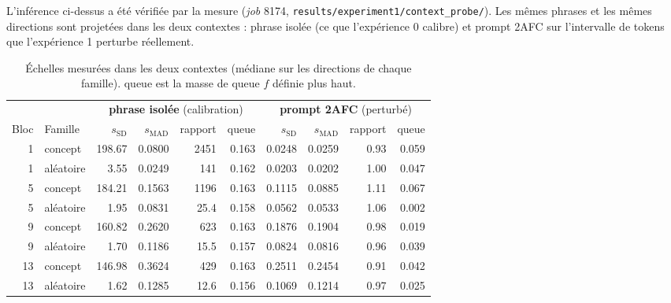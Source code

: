 \documentclass[11pt,a4paper]{article}
\newcommand{\ssd}{s_{\mathrm{SD}}}
\newcommand{\smad}{s_{\mathrm{MAD}}}
\newcommand{\code}[1]{\texttt{\small #1}}
\begin{document}
L'inférence ci-dessus a été vérifiée par la mesure (\emph{job} \num{8174},
\code{results/experiment1/context\_probe/}). Les mêmes phrases et les mêmes directions
sont projetées dans les deux contextes : phrase isolée (ce que l'expérience 0 calibre) et
prompt 2AFC sur l'intervalle de tokens que l'expérience 1 perturbe réellement.

\begin{table}[h]
\centering
\caption{Échelles mesurées dans les deux contextes (médiane sur les directions de chaque
famille). \og queue \fg{} est la masse de queue $f$ définie plus haut.}
\label{tab:probe}
\begin{tabular}{rl|rrrr|rrrr}
\toprule
& & \multicolumn{4}{c|}{\textbf{phrase isolée} (calibration)}
  & \multicolumn{4}{c}{\textbf{prompt 2AFC} (perturbé)} \\
Bloc & Famille & $\ssd$ & $\smad$ & rapport & queue
               & $\ssd$ & $\smad$ & rapport & queue \\
\midrule
1  & concept   & \num{198.67} & \num{0.0800} & \num{2451} & \num{0.163}
               & \num{0.0248} & \num{0.0259} & \num{0.93} & \num{0.059} \\
1  & aléatoire & \num{3.55}   & \num{0.0249} & \num{141}  & \num{0.162}
               & \num{0.0203} & \num{0.0202} & \num{1.00} & \num{0.047} \\
5  & concept   & \num{184.21} & \num{0.1563} & \num{1196} & \num{0.163}
               & \num{0.1115} & \num{0.0885} & \num{1.11} & \num{0.067} \\
5  & aléatoire & \num{1.95}   & \num{0.0831} & \num{25.4} & \num{0.158}
               & \num{0.0562} & \num{0.0533} & \num{1.06} & \num{0.002} \\
9  & concept   & \num{160.82} & \num{0.2620} & \num{623}  & \num{0.163}
               & \num{0.1876} & \num{0.1904} & \num{0.98} & \num{0.019} \\
9  & aléatoire & \num{1.70}   & \num{0.1186} & \num{15.5} & \num{0.157}
               & \num{0.0824} & \num{0.0816} & \num{0.96} & \num{0.039} \\
13 & concept   & \num{146.98} & \num{0.3624} & \num{429}  & \num{0.163}
               & \num{0.2511} & \num{0.2454} & \num{0.91} & \num{0.042} \\
13 & aléatoire & \num{1.62}   & \num{0.1285} & \num{12.6} & \num{0.156}
               & \num{0.1069} & \num{0.1214} & \num{0.97} & \num{0.025} \\
\bottomrule
\end{tabular}
\end{table}
\end{document}
